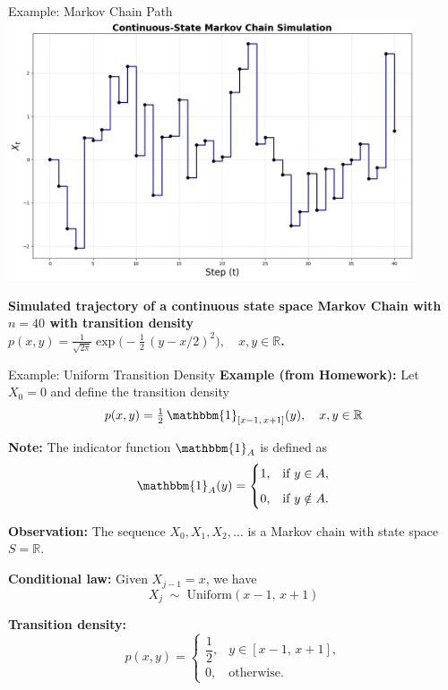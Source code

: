 \documentclass[8pt]{beamer}
\begin{document}
\begin{frame}{Example: Markov Chain Path}
\centering
\includegraphics[width=0.9\textwidth]{chapter2-part3-plot1.png}

\vspace{3mm}
\textbf{Simulated trajectory of a continuous state space Markov Chain with $n=40$ with transition density $
p(x,y) = \frac{1}{\sqrt{2\pi}} 
\exp\!\Bigg(-\tfrac{1}{2}\,(y - x/2)^2 \Bigg),
\quad x,y \in \mathbb{R}
$.}
\end{frame}

\begin{frame}{Example: Uniform Transition Density}
\textbf{Example (from Homework):}  
Let $X_0 = 0$ and define the transition density
\begin{equation*}
p(x,y) = \tfrac{1}{2} \, \mathbbm{1}_{[x-1,\,x+1]}(y), 
\quad x,y \in \mathbb{R}
\end{equation*}

\vspace{3mm}

\textbf{Note:} The indicator function $\mathbbm{1}_A$ is defined as
\begin{equation*}
\mathbbm{1}_A(y) =
\begin{cases}
1, & \text{if } y \in A, \\[2mm]
0, & \text{if } y \notin A.
\end{cases}
\end{equation*}

\textbf{Observation:}  
The sequence $X_0, X_1, X_2, \ldots$ is a Markov chain with state space $S=\mathbb{R}$.

\textbf{Conditional law:}  
Given $X_{j-1} = x$, we have
\begin{equation*}
X_j \;\sim\; \text{Uniform}(x-1, \, x+1)
\end{equation*}

\textbf{Transition density:}
\begin{equation*}
p(x,y) =
\begin{cases}
\dfrac{1}{2}, & y \in [x-1,\,x+1], \\[2mm]
0, & \text{otherwise}.
\end{cases}
\end{equation*}
\end{frame}
\end{document}
